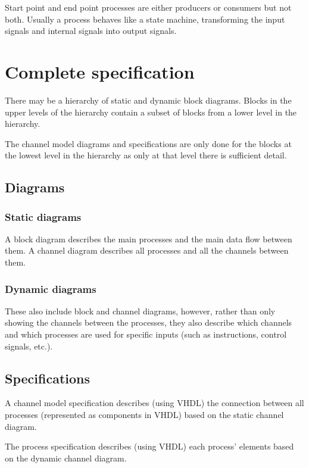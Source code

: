 \documentclass{report}
\begin{document}
Start point and end point processes are either producers or consumers but not
both. Usually a process behaves like a state machine, transforming the input
signals and internal signals into output signals.

\section{Complete specification}

There may be a hierarchy of static and dynamic block diagrams. Blocks in the
upper levels of the hierarchy contain a subset of blocks from a lower level in
the hierarchy.

The channel model diagrams and specifications are only done for the blocks at
the lowest level in the hierarchy as only at that level there is sufficient
detail.

\subsection{Diagrams}

\subsubsection{Static diagrams}

A block diagram describes the main processes and the main data flow between
them.
A channel diagram describes all processes and all the channels between them.

\subsubsection{Dynamic diagrams}

These also include block and channel diagrams, however, rather than only showing
the channels between the processes, they also describe which channels and which
processes are used for specific inputs (such as instructions, control signals,
etc.).

\subsection{Specifications}

A channel model specification describes (using VHDL) the connection between all
processes (represented as components in VHDL) based on the static channel
diagram.

The process specification describes (using VHDL) each process' elements based on
the dynamic channel diagram.
\end{document}
